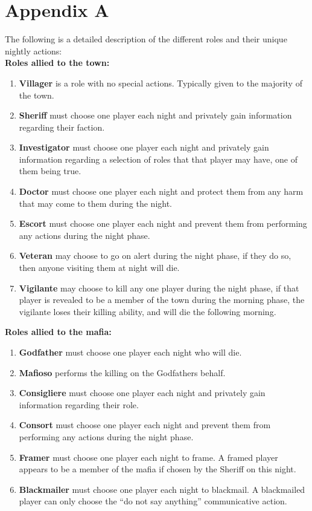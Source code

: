 \section{Appendix A}\label{app:A}
The following is a detailed description of the different roles and their unique nightly actions: \\
\textbf{Roles allied to the town:} 
\begin{enumerate}
	\item\textbf{Villager} is a  role with no special actions. Typically given to the majority of the town. 
	\item\textbf{Sheriff} must choose one player each night and privately gain information regarding their faction. 
	\item\textbf{Investigator} must choose one player each night and privately gain information regarding a selection of roles that that player may have, one of them being true.
	\item\textbf{Doctor} must choose one player each night and protect them from any harm that may come to them during the night. 
	\item\textbf{Escort} must choose one player each night and prevent them from performing any actions during the night phase.
	\item\textbf{Veteran} may choose to go on alert during the night phase, if they do so, then anyone visiting them at night will die. 
	\item\textbf{Vigilante} may choose to kill any one player during the night phase, if that player is revealed to be a member of the town during the morning phase, the vigilante loses their killing ability, and will die the following morning.
\end{enumerate}
\textbf{Roles allied to the mafia:} 
\begin{enumerate}
	\item\textbf{Godfather} must choose one player each night who will die.
	\item\textbf{Mafioso} performs the killing on the Godfathers behalf.
	\item\textbf{Consigliere} must choose one player each night and privately gain information regarding their role. 
	\item\textbf{Consort} must choose one player each night and prevent them from performing any actions during the night phase.
	\item\textbf{Framer} must choose one player each night to frame. A framed player appears to be a member of the mafia if chosen by the Sheriff on this night.
	\item\textbf{Blackmailer} must choose one player each night to blackmail. A blackmailed player can only choose the “do not say anything” communicative action. 
\end{enumerate}